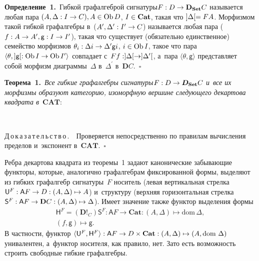 \begin{multicols}{2}
     \smallskip
     
     \noindent
     \textbf{Определение~1.}\ Гибкой графалгеброй сигнатуры\linebreak $F : D \hm\to  
\mathbf{D}_{\mathbf{Set}}C$ называется любая пара $(A, \Delta : I \hm\to  C), A 
\hm\in \mathrm{Ob}\, D$, $I \hm\in \mathbf{Cat}$, такая что $]\Delta[ \hm= FA$.\linebreak 
Морфизмом такой гиб\-кой графалгебры в~($A^\prime, \Delta^\prime : 
I^\prime\hm\to  C$) называется любая пара ($f : A \hm\to  A^\prime, \mathsf {g} : 
I \hm\to  I^\prime$), такая что существует (обязательно единственное) семейство 
морфизмов $\theta_i : \Delta i \hm\to  \Delta^\prime \mathsf {g}i$, $i \hm\in 
\mathrm{Ob}\,I$, такое что пара $\langle \theta, ]\mathsf{g}[ : 
\mathrm{Ob}\,I\hm\to  \mathrm{Ob}\,I^\prime\rangle$ совпадает с~$Ff : ]\Delta[ 
\hm\to  ]\Delta^\prime[$, а~пара $\langle\theta, \mathsf {g}\rangle$ 
пред\-став\-ля\-ет собой морфизм диаграммы~$\Delta$ в~$\Delta^\prime$ 
в~$\mathbf{D}C$.~\hfill$\square$
     
     \smallskip
     
     \noindent
     \textbf{Теорема~1.}\ \textit{Все гибкие графалгебры сигнатуры\linebreak $F : D 
\hm\to  {\bm D}_{\mathbf{Set}}C$ и~все их морфизмы образуют категорию, изоморфную 
вершине сле\-ду\-юще\-го декартова квадрата в}~$\mathbf{CAT}$:

\vspace*{1pt}
      \begin{center}
     \mbox{%
\epsfxsize=28.351mm 
}
\end{center}

     \noindent
     Д\,о\,к\,а\,з\,а\,т\,е\,л\,ь\,с\,т\,в\,о\,.\ \  Проверяется непосредственно по 
правилам вычисления пределов и~экспонент в~$\mathbf{CAT}$.~\hfill$\square$
     
     \smallskip
     
     Ребра декартова квадрата из теоремы~1 задают канонические 
забывающие функторы, которые, аналогично графалгебрам фиксированной 
формы, выделяют из гиб\-ких графалгебр сигнатуры~$F$ носитель (левая 
вертикальная стрел\-ка $\mathsf {U}^ F : \mathsf {A}F \hm\to D : (A, \Delta) 
\hm\mapsto A$) и~структуру (верх\-няя горизонтальная стрелка $\mathsf {S}^F : 
\mathsf {A}F \hm\to \mathbf{D}C : (A, \Delta) \hm\mapsto \Delta$). Имеет 
значение также функтор выделения формы
     \begin{multline*}
     \mathsf {H}^F = (\mathbf{D}!_C)\mathsf {S}^F : \mathsf {A}F \to 
\mathbf{Cat} : (A, \Delta) \mapsto \mathrm{dom}\,\Delta,\\
 (f, \mathsf {g}) \mapsto  
\mathsf {g}.
\end{multline*}
В частности, функтор $\langle \mathsf {U}^F, \mathsf {H}^F \rangle : 
\mathsf {A}F \hm\to  D \times \mathbf{Cat} : (A, \Delta) \hm\mapsto (A, 
\mathrm{dom}\ \Delta)$ унивалентен, а~функтор носителя, как правило, нет. Зато 
есть возможность строить свободные гиб\-кие графалгебры.


\end{multicols}
